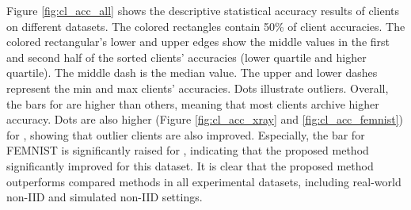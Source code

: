 Figure \ref{fig:cl_acc_all} shows the descriptive statistical accuracy results of \parties{} clients on different datasets. The colored rectangles contain 50\% of client accuracies. The colored rectangular's lower and upper edges show the middle values in the first and second half of the sorted clients' accuracies (lower quartile and higher quartile). The middle dash is the median value. The upper and lower dashes represent the min and max clients' accuracies. Dots illustrate outliers. Overall, the bars for \MethodnameShort{} are higher than others, meaning that most clients archive higher accuracy. Dots are also higher (Figure \ref{fig:cl_acc_xray} and \ref{fig:cl_acc_femnist}) for \MethodnameShort{}, showing that outlier clients are also improved. Especially, the bar for FEMNIST is significantly raised for \MethodnameShort{}, indicating that the proposed method significantly improved for this dataset. It is clear that the proposed method outperforms compared methods in all experimental datasets, including real-world non-IID and simulated non-IID settings.

